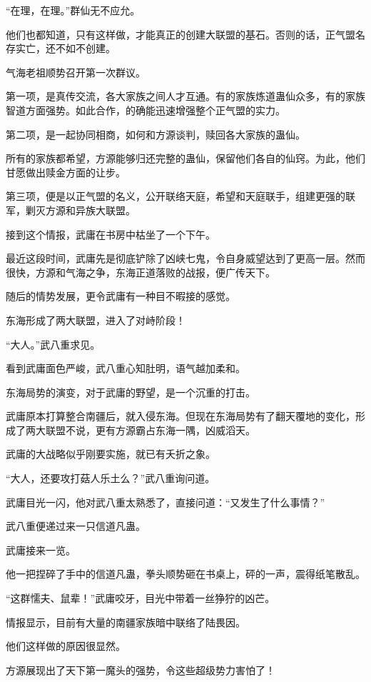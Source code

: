 \begin{this_body}
“在理，在理。”群仙无不应允。

他们也都知道，只有这样做，才能真正的创建大联盟的基石。否则的话，正气盟名存实亡，还不如不创建。

气海老祖顺势召开第一次群议。

第一项，是真传交流，各大家族之间人才互通。有的家族炼道蛊仙众多，有的家族智道方面强势。如此合作，的确能迅速增强整个正气盟的实力。

第二项，是一起协同相商，如何和方源谈判，赎回各大家族的蛊仙。

所有的家族都希望，方源能够归还完整的蛊仙，保留他们各自的仙窍。为此，他们甘愿做出赎金方面的让步。

第三项，便是以正气盟的名义，公开联络天庭，希望和天庭联手，组建更强的联军，剿灭方源和异族大联盟。

接到这个情报，武庸在书房中枯坐了一个下午。

最近这段时间，武庸先是彻底铲除了凶峡七鬼，令自身威望达到了更高一层。然而很快，方源和气海之争，东海正道落败的战报，便广传天下。

随后的情势发展，更令武庸有一种目不暇接的感觉。

东海形成了两大联盟，进入了对峙阶段！

“大人。”武八重求见。

看到武庸面色严峻，武八重心知肚明，语气越加柔和。

东海局势的演变，对于武庸的野望，是一个沉重的打击。

武庸原本打算整合南疆后，就入侵东海。但现在东海局势有了翻天覆地的变化，形成了两大联盟不说，更有方源霸占东海一隅，凶威滔天。

武庸的大战略似乎刚要实施，就已有夭折之象。

“大人，还要攻打菇人乐土么？”武八重询问道。

武庸目光一闪，他对武八重太熟悉了，直接问道：“又发生了什么事情？”

武八重便递过来一只信道凡蛊。

武庸接来一览。

他一把捏碎了手中的信道凡蛊，拳头顺势砸在书桌上，砰的一声，震得纸笔散乱。

“这群懦夫、鼠辈！”武庸咬牙，目光中带着一丝狰狞的凶芒。

情报显示，目前有大量的南疆家族暗中联络了陆畏因。

他们这样做的原因很显然。

方源展现出了天下第一魔头的强势，令这些超级势力害怕了！


\end{this_body}

